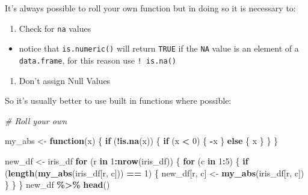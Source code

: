 \documentclass[
]{article}
\newenvironment{Shaded}{\begin{snugshade}}{\end{snugshade}}
\newcommand{\CommentTok}[1]{\textcolor[rgb]{0.56,0.35,0.01}{\textit{#1}}}
\newcommand{\ControlFlowTok}[1]{\textcolor[rgb]{0.13,0.29,0.53}{\textbf{#1}}}
\newcommand{\DecValTok}[1]{\textcolor[rgb]{0.00,0.00,0.81}{#1}}
\newcommand{\KeywordTok}[1]{\textcolor[rgb]{0.13,0.29,0.53}{\textbf{#1}}}
\newcommand{\NormalTok}[1]{#1}
\newcommand{\OperatorTok}[1]{\textcolor[rgb]{0.81,0.36,0.00}{\textbf{#1}}}
\newcommand{\StringTok}[1]{\textcolor[rgb]{0.31,0.60,0.02}{#1}}
\providecommand{\tightlist}{%
  \setlength{\itemsep}{0pt}\setlength{\parskip}{0pt}}
\begin{document}
It's always possible to roll your own function but in doing so it is
necessary to:

\begin{enumerate}
\def\labelenumi{\arabic{enumi}.}
\tightlist
\item
  Check for \texttt{na} values
\end{enumerate}

\begin{itemize}
\tightlist
\item
  notice that \texttt{is.numeric()} will return \texttt{TRUE} if the
  \texttt{NA} value is an element of a \texttt{data.frame}, for this
  reason use \texttt{!\ is.na()}
\end{itemize}

\begin{enumerate}
\def\labelenumi{\arabic{enumi}.}
\setcounter{enumi}{1}
\tightlist
\item
  Don't assign Null Values
\end{enumerate}

So it's usually better to use built in functions where possible:

\begin{Shaded}
\begin{Highlighting}[]
\CommentTok{\# Roll your own}

\NormalTok{my\_abs <{-}}\StringTok{ }\ControlFlowTok{function}\NormalTok{(x) \{}
  \ControlFlowTok{if}\NormalTok{ (}\OperatorTok{!}\KeywordTok{is.na}\NormalTok{(x)) \{}
    \ControlFlowTok{if}\NormalTok{ (x }\OperatorTok{<}\StringTok{ }\DecValTok{0}\NormalTok{) \{}
      \OperatorTok{{-}}\NormalTok{x}
\NormalTok{    \} }\ControlFlowTok{else}\NormalTok{ \{}
\NormalTok{      x}
\NormalTok{    \}}
\NormalTok{  \}}
\NormalTok{\}}


\NormalTok{new\_df <{-}}\StringTok{ }\NormalTok{iris\_df}
\ControlFlowTok{for}\NormalTok{ (r }\ControlFlowTok{in} \DecValTok{1}\OperatorTok{:}\KeywordTok{nrow}\NormalTok{(iris\_df)) \{}
  \ControlFlowTok{for}\NormalTok{ (c }\ControlFlowTok{in} \DecValTok{1}\OperatorTok{:}\DecValTok{5}\NormalTok{) \{}
    \ControlFlowTok{if}\NormalTok{ (}\KeywordTok{length}\NormalTok{(}\KeywordTok{my\_abs}\NormalTok{(iris\_df[r, c])) }\OperatorTok{==}\StringTok{ }\DecValTok{1}\NormalTok{) \{}
\NormalTok{      new\_df[r, c] <{-}}\StringTok{ }\KeywordTok{my\_abs}\NormalTok{(iris\_df[r, c])}
\NormalTok{    \}}
\NormalTok{  \}}
\NormalTok{\}}
\NormalTok{new\_df }\OperatorTok{\%>\%}\StringTok{ }\KeywordTok{head}\NormalTok{()}
\end{Highlighting}
\end{Shaded}
\end{document}
